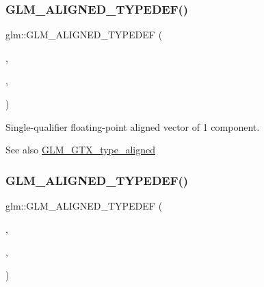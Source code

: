 \subsubsection{\texorpdfstring{G\+L\+M\+\_\+\+A\+L\+I\+G\+N\+E\+D\+\_\+\+T\+Y\+P\+E\+D\+E\+F()}{GLM\_ALIGNED\_TYPEDEF()}\hspace{0.1cm}{\footnotesize\ttfamily [151/209]}}
{\footnotesize\ttfamily glm\+::\+G\+L\+M\+\_\+\+A\+L\+I\+G\+N\+E\+D\+\_\+\+T\+Y\+P\+E\+D\+EF (\begin{DoxyParamCaption}\item[{\hyperlink{group__gtc__type__precision_ga27d40e360fd5b6ad39ca34ded8210b53}{f32vec1}}]{,  }\item[{aligned\+\_\+f32vec1}]{,  }\item[{4}]{ }\end{DoxyParamCaption})}

Single-\/qualifier floating-\/point aligned vector of 1 component. \begin{DoxySeeAlso}{See also}
\hyperlink{group__gtx__type__aligned}{G\+L\+M\+\_\+\+G\+T\+X\+\_\+type\+\_\+aligned} 
\end{DoxySeeAlso}
\mbox{\label{group__gtx__type__aligned_ga5e185865a2217d0cd47187644683a8c3}} 
\subsubsection{\texorpdfstring{G\+L\+M\+\_\+\+A\+L\+I\+G\+N\+E\+D\+\_\+\+T\+Y\+P\+E\+D\+E\+F()}{GLM\_ALIGNED\_TYPEDEF()}\hspace{0.1cm}{\footnotesize\ttfamily [152/209]}}
{\footnotesize\ttfamily glm\+::\+G\+L\+M\+\_\+\+A\+L\+I\+G\+N\+E\+D\+\_\+\+T\+Y\+P\+E\+D\+EF (\begin{DoxyParamCaption}\item[{\hyperlink{group__gtc__type__precision_gaeb896022a9c59e8c3c4ce627c66c9262}{f32vec2}}]{,  }\item[{aligned\+\_\+f32vec2}]{,  }\item[{8}]{ }\end{DoxyParamCaption})}

